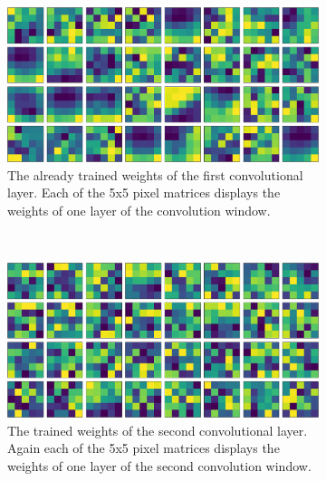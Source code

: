 \newpage

\begin{figure}[h!]
	\centering
	\begin{subfigure}[t]{0.585\textwidth}
		\centering
		\includegraphics[width=\textwidth]{img/implementation_neuralNetwork_structureOfOurNeuralNetwork_conv2D_1.png}
		\caption{The already trained weights of the first convolutional layer. Each of the 5x5 pixel matrices displays the weights of one layer of the convolution window.}
		\label{pic:implementation_neuralNetwork_structureOfOurNeuralNetwork_weights_a}
	\end{subfigure}
	~
	\begin{subfigure}[t]{0.585\textwidth}
		\centering
		\includegraphics[width=\textwidth]{img/implementation_neuralNetwork_structureOfOurNeuralNetwork_conv2D_2.png}
		\caption{The trained weights of the second convolutional layer. Again each of the 5x5 pixel matrices displays the weights of one layer of the second convolution window.}
		\label{pic:implementation_neuralNetwork_structureOfOurNeuralNetwork_weights_b}
	\end{subfigure}
	~
	\begin{subfigure}[t]{0.385\textwidth}
		\centering

\end{subfigure}
\end{figure}
